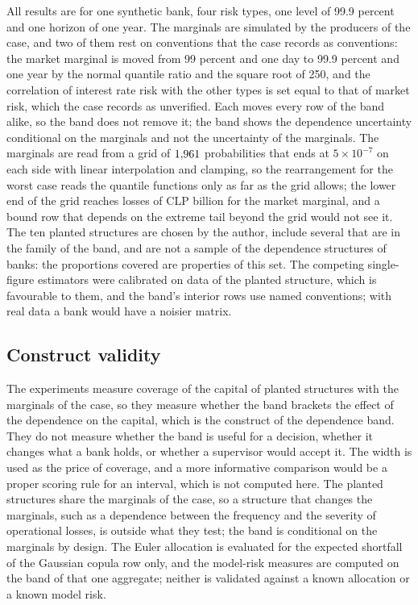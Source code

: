 All results are for one synthetic bank, four risk types, one level of 99.9 percent and one horizon of one year. The marginals are
simulated by the producers of the case, and two of them rest on conventions that the case records as conventions: the
market marginal is moved from 99 percent and one day to 99.9 percent and one year by the normal quantile ratio and the square root
of 250, and the correlation of interest rate risk with the other types is set equal to that of market risk, which the case records as unverified. Each moves every row
of the band alike, so the band does not remove it; the band shows the dependence uncertainty conditional on the marginals and not
the uncertainty of the marginals. The marginals are read from a grid of $1{,}961$ probabilities that ends at $5\times10^{-7}$ on each
side with linear interpolation and clamping, so the rearrangement for the worst case reads the quantile functions only as far as
the grid allows; the lower end of the grid reaches losses of CLP \bdMarketGridMin{} billion for the market marginal, and a bound row
that depends on the extreme tail beyond the grid would not see it. The ten planted structures are chosen by the author, include
several that are in the family of the band, and are not a sample of the dependence structures of banks: the proportions covered
are properties of this set. The competing single-figure estimators were calibrated on data of the planted structure, which is
favourable to them, and the band's interior rows use named conventions; with real data a bank would have a noisier matrix.

\subsection{Construct validity}
\label{sec:limits-construct}

The experiments measure coverage of the capital of planted structures with the marginals of the case, so they measure whether the
band brackets the effect of the dependence on the capital, which is the construct of the dependence band. They do not measure
whether the band is useful for a decision, whether it changes what a bank holds, or whether a supervisor would accept it. The
width is used as the price of coverage, and a more informative comparison would be a proper scoring rule for an interval, which
is not computed here. The planted structures share the marginals of the case, so a structure that changes the marginals, such as a
dependence between the frequency and the severity of operational losses, is outside what they test; the band is conditional on
the marginals by design. The Euler allocation is evaluated for the expected shortfall of the Gaussian copula row only, and the
model-risk measures are computed on the band of that one aggregate; neither is validated against a known allocation or a known
model risk.

